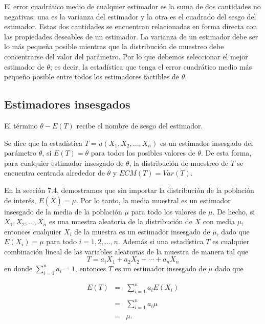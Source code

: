 El error cuadrático medio de cualquier estimador es la suma de dos cantidades no negativas: una es la varianza del estimador y la otra es el cuadrado del sesgo del estimador. Estas dos cantidades se encuentran relacionadas en forma directa con las propiedades deseables de un estimador. La varianza de un estimador debe ser lo más pequeña posible mientras que la distribución de muestreo debe concentrarse del valor del parámetro. Por lo que debemos seleccionar el mejor estimador de $\theta$; es decir, la estadística que tenga el error cuadrático medio más pequeño posible entre todos los estimadores factibles de $\theta$. \\

\subsection{Estimadores insesgados}
El término $\theta-E(T)$ recibe el nombre de sesgo del estimador.

\begin{def.}
    Se dice que la estadística $T=u(X_1,X_2,\ldots,X_n)$ es un estimador insesgado del parámetro $\theta$, si $E(T)=\theta$ para todos los posibles valores de $\theta$. De esta forma, para cualquier estimador insesgado de $\theta$, la distribución de muestreo de $T$ se encuentra centrada alrededor de $\theta$ y $ECM(T)=Var(T)$.
\end{def.}

En la sección 7.4, demostramos que sin importar la distribución de la población de interés, $E(\overline{X})=\mu$. Por lo tanto, la media muestral es un estimador insesgado de la media de la población $\mu$ para todo los valores de $\mu$. De hecho, si $X_1,X_2,\ldots,X_n$ es una muestra aleatoria de la distribución de $X$ con media $\mu$, entonces cualquier $X_i$ de la muestra es un estimador insesgado de $\mu$, dado que $E(X_i)=\mu$ para todo $i=1,2,\ldots, n$. Además si una estadística $T$ es cualquier combinación lineal de las variables aleatorias de la muestra de manera tal que
$$T=a_iX_1+a_2X_2+\cdots+a_nX_n$$
en donde $\sum_{i=1}^n a_i=1$, entonces $T$ es un estimador insesgado de $\mu$ dado que

$$
\begin{array}{rcl}
    E(T) &=& \displaystyle\sum_{i=1}^n a_iE(X_i)\\\\
	 &=& \displaystyle\sum_{i=1}^n a_i\mu\\\\
	 &=& \mu.
\end{array}
$$

